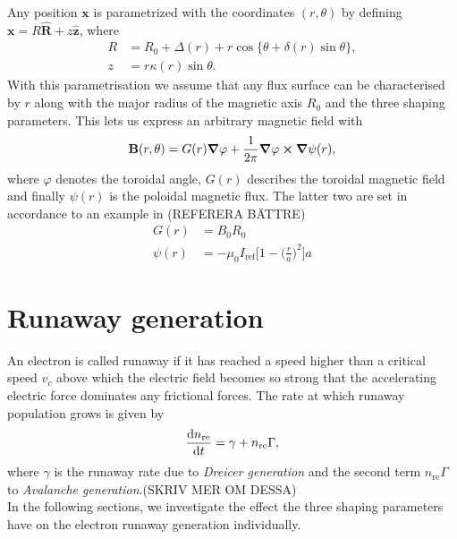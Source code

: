 \documentclass[11pt,a4paper]{article}
\renewcommand{\vec}[1]{\boldsymbol{\mathbf{#1}}}
\begin{document}
\noindent
Any position $\vec{x}$ is parametrized with the coordinates $(r, \theta)$ by defining $\vec{x}=R\vec{\hat{R}}+z\vec{\hat{z}}$, where
\begin{align*}
    R
    &=R_0+\Delta(r)+r\cos\{\theta+\delta(r)\sin\theta\},\\
    z
    &=r\kappa(r)\sin\theta.
\end{align*}
With this parametrisation we assume that any flux surface can be characterised by $r$ along with the major radius of the magnetic axis $R_0$ and the three shaping parameters.
This lets us express an arbitrary magnetic field with
\begin{align}
    \label{eq:magnetic}
    \vec{B}(r, \theta)
    =G(r)\grad{\varphi}+\frac{1}{2\pi}\grad{\varphi}\cross\grad{\psi(r)},
\end{align}
where $\varphi$ denotes the toroidal angle, $G(r)$ describes the toroidal magnetic field and finally $\psi(r)$ is the poloidal magnetic flux.
The latter two are set in accordance to an example in \cite{DREAM} (REFERERA BÄTTRE)
\begin{align*}
    G(r)
    &= B_0 R_0\\
    \psi(r)
    &=-\mu_0 I_\text{ref} \bigg[1-\bigg(\frac{r}{a}\bigg)^2\bigg] a
\end{align*}

\section{Runaway generation}
An electron is called runaway if it has reached a speed higher than a critical speed $v_c$ above which the electric field becomes so strong that the accelerating electric force dominates any frictional forces.
The rate at which runaway population grows is given by
\begin{align*}
    \dv{n_\text{re}}{t}
    =\gamma+n_\text{re}\Gamma,
\end{align*}
where $\gamma$ is the runaway rate due to \textit{Dreicer generation} and the second term $n_\text{re}\Gamma$ to \textit{Avalanche generation}.(SKRIV MER OM DESSA)\\

In the following sections, we investigate the effect the three shaping parameters have on the electron runaway generation individually.
\\
\end{document}

